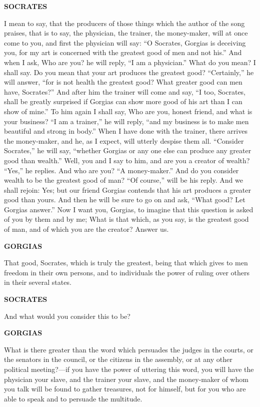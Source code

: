 \documentclass[11pt,letter]{article}
\begin{document}
\par \textbf{SOCRATES}
\par   I mean to say, that the producers of those things which the author of the song praises, that is to say, the physician, the trainer, the money-maker, will at once come to you, and first the physician will say:  “O Socrates, Gorgias is deceiving you, for my art is concerned with the greatest good of men and not his.” And when I ask, Who are you? he will reply, “I am a physician.” What do you mean? I shall say. Do you mean that your art produces the greatest good? “Certainly,” he will answer, “for is not health the greatest good? What greater good can men have, Socrates?” And after him the trainer will come and say, “I too, Socrates, shall be greatly surprised if Gorgias can show more good of his art than I can show of mine.” To him again I shall say, Who are you, honest friend, and what is your business? “I am a trainer,” he will reply, “and my business is to make men beautiful and strong in body.” When I have done with the trainer, there arrives the money-maker, and he, as I expect, will utterly despise them all. “Consider Socrates,” he will say, “whether Gorgias or any one else can produce any greater good than wealth.” Well, you and I say to him, and are you a creator of wealth? “Yes,” he replies. And who are you? “A money-maker.” And do you consider wealth to be the greatest good of man? “Of course,” will be his reply. And we shall rejoin:  Yes; but our friend Gorgias contends that his art produces a greater good than yours. And then he will be sure to go on and ask, “What good? Let Gorgias answer.” Now I want you, Gorgias, to imagine that this question is asked of you by them and by me; What is that which, as you say, is the greatest good of man, and of which you are the creator? Answer us.

\par \textbf{GORGIAS}
\par   That good, Socrates, which is truly the greatest, being that which gives to men freedom in their own persons, and to individuals the power of ruling over others in their several states.

\par \textbf{SOCRATES}
\par   And what would you consider this to be?

\par \textbf{GORGIAS}
\par   What is there greater than the word which persuades the judges in the courts, or the senators in the council, or the citizens in the assembly, or at any other political meeting?—if you have the power of uttering this word, you will have the physician your slave, and the trainer your slave, and the money-maker of whom you talk will be found to gather treasures, not for himself, but for you who are able to speak and to persuade the multitude.
\end{document}
